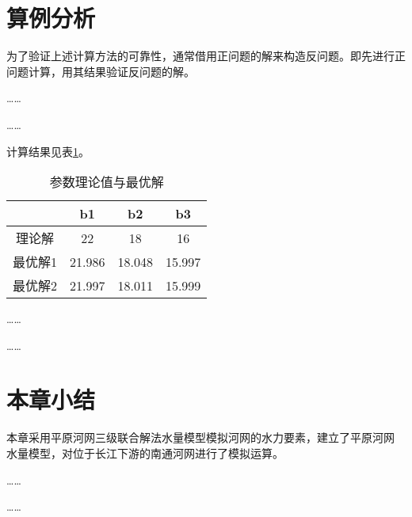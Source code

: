 \section{算例分析}
为了验证上述计算方法的可靠性，通常借用正问题的解来构造反问题。即先进行正问题计算，用其结果验证反问题的解。\par
……\par
……\par
计算结果见表\ref{tab:parameter}。

\begin{table}[H]\small	%
	\centering
	\caption{参数理论值与最优解} \label{tab:parameter}
	\begin{tabular*}{0.75\textwidth}{@{\extracolsep{\fill}}cccc}
		\toprule
		\multicolumn{1}{l}{} & b1     & b2     & b3     \\\midrule
		理论解                  & 22     & 18     & 16     \\
		最优解1                 & 21.986 & 18.048 & 15.997 \\
		最优解2                 & 21.997 & 18.011 & 15.999 \\ \bottomrule
	\end{tabular*}%
\end{table}


……\par
……
\section{本章小结}
本章采用平原河网三级联合解法水量模型模拟河网的水力要素，建立了平原河网
水量模型，对位于长江下游的南通河网进行了模拟运算。\par
……\par
……
